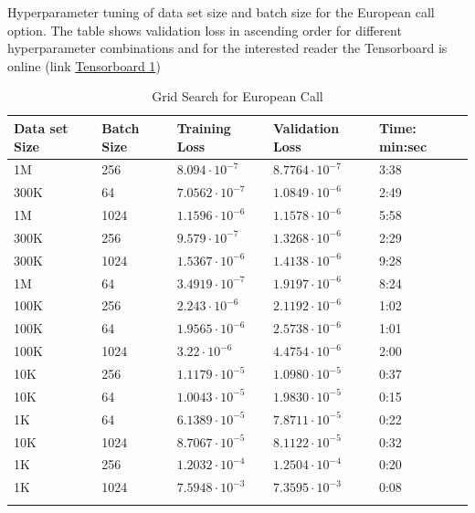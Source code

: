 \begin{table}[th]
\caption{Grid Search for European Call}{Hyperparameter tuning of data set size and batch size for the European call option. The table shows validation loss in ascending order for different hyperparameter combinations and for the interested reader the Tensorboard is online (link \href{https://tensorboard.dev/experiment/8pxUoSDmTVGMOxpJWgiZsA/}{Tensorboard 1})}
\label{tab:hyperEuroC1}
\centering
\begin{tabular}{lllll}
\toprule
\textbf{Data set Size} & \textbf{Batch Size} & \textbf{Training Loss} & \textbf{Validation Loss} & \textbf{Time: min:sec}\\
\midrule
1M    & 256   & $8.094\cdot 10^{-7}$ & $8.7764\cdot 10^{-7}$ & 3:38 \\ 
300K  & 64    & $7.0562\cdot 10^{-7}$ & $1.0849\cdot 10^{-6}$ & 2:49 \\ 
1M    & 1024  & $1.1596\cdot 10^{-6}$ & $1.1578\cdot 10^{-6}$ & 5:58 \\ 
300K  & 256   & $9.579\cdot 10^{-7}$ & $1.3268\cdot 10^{-6}$ & 2:29 \\ 
300K  & 1024  & $1.5367\cdot 10^{-6}$ & $1.4138\cdot 10^{-6}$ & 9:28 \\ 
1M   & 64    & $3.4919\cdot 10^{-7}$ & $1.9197\cdot 10^{-6}$ & 8:24\\ 
100K  & 256   & $2.243\cdot 10^{-6}$ & $2.1192\cdot 10^{-6}$ & 1:02  \\ 
100K  & 64    & $1.9565\cdot 10^{-6}$ & $2.5738\cdot 10^{-6}$ & 1:01 \\ 
100K  & 1024  & $3.22\cdot 10^{-6}$ & $4.4754\cdot 10^{-6}$ & 2:00\\ 
10K  & 256   & $1.1179\cdot 10^{-5}$ & $1.0980\cdot 10^{-5}$ & 0:37 \\ 
10K   & 64    & $1.0043\cdot 10^{-5}$ & $1.9830\cdot 10^{-5}$ & 0:15 \\ 
1K   & 64    & $6.1389\cdot 10^{-5}$ & $7.8711\cdot 10^{-5}$ & 0:22\\ 
10K   & 1024 & $8.7067\cdot 10^{-5}$ & $8.1122\cdot 10^{-5}$ & 0:32  \\ 
1K   & 256   & $1.2032\cdot 10^{-4}$ & $1.2504\cdot 10^{-4}$ & 0:20    \\ 
1K    & 1024  & $7.5948\cdot 10^{-3}$ & $7.3595\cdot 10^{-3}$ & 0:08    \\ 
\bottomrule\\
\end{tabular}
\end{table}

